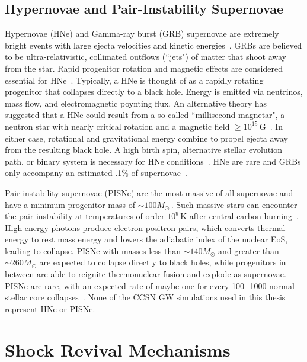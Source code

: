 \subsection{Hypernovae and Pair-Instability Supernovae}

Hypernovae (HNe) and Gamma-ray burst (GRB) supernovae are extremely bright events with large ejecta velocities and kinetic energies~\cite{iwamoto1998hypernova}. GRBs are believed to be ultra-relativistic, collimated outflows (``jets") of matter that shoot away from the star. Rapid progenitor rotation and magnetic effects are considered essential for HNe~\cite{woosley2006supernova}. Typically, a HNe is thought of as a rapidly rotating progenitor that collapses directly to a black hole. Energy is emitted via neutrinos, mass flow, and electromagnetic poynting flux. An alternative theory has suggested that a HNe could result from a so-called ``millisecond magnetar", a neutron star with nearly critical rotation and a magnetic field $\geq10^{15}$\,G~\cite{janka}. In either case, rotational and gravitational energy combine to propel ejecta away from the resulting black hole. A high birth spin, alternative stellar evolution path, or binary system is necessary for HNe conditions~\cite{yoon2005evolution, woosley2006progenitor}. HNe are rare and GRBs only accompany an estimated .1\% of supernovae~\cite{janka}.

Pair-instability supernovae (PISNe) are the most massive of all supernovae and have a minimum progenitor mass of $\sim100M_\odot$\,. Such massive stars can encounter the pair-instability at temperatures of order $10^{9}$\,K after central carbon burning~\cite{woosley2002evolution, heger2003heger}. High energy photons produce electron-positron pairs, which converts thermal energy to rest mass energy and lowers the adiabatic index of the nuclear EoS, leading to collapse. PISNe with masses less than $\sim140M_\odot$ and greater than $\sim260M_\odot$ are expected to collapse directly to black holes, while progenitors in between are able to reignite thermonuclear fusion and explode as supernovae. PISNe are rare, with an expected rate of maybe one for every 100\,-\,1000 normal stellar core collapses~\cite{janka}. None of the CCSN GW simulations used in this thesis represent HNe or PISNe.

\section{Shock Revival Mechanisms}
\label{sec:mechanisms}

